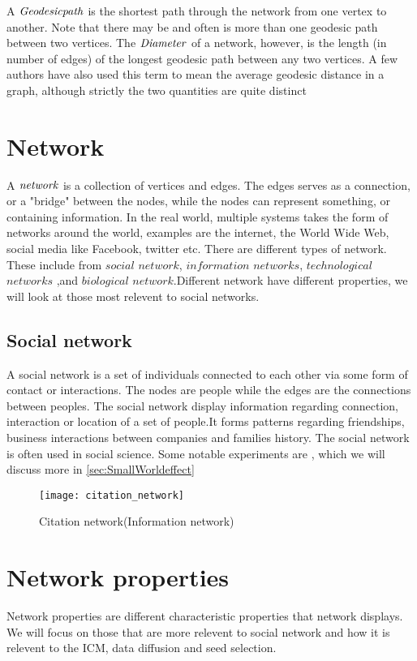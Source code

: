 A $\it{{Geodesic path}}$ is the shortest path through the network from one vertex to another. Note that there may be and often is more than one geodesic path between two vertices. The $\it{{Diameter}}$ of a network, however,  is the length (in number of edges) of the longest geodesic path between any two vertices. A few authors have also used this term to mean the average geodesic distance in a graph, although strictly the two quantities are quite distinct

\section{Network}
A $\it{network}$ is a collection of vertices and edges\cite{ComplexNetwork2003}. The edges serves as a connection, or a "bridge" between the nodes, while the nodes can represent something, or containing information. In the real world, multiple systems takes the form of networks around the world, examples are the internet, the World Wide Web, social media like Facebook, twitter etc.  There are different types of network. These include from $social$ $network$, ${information}$ ${networks}$, $technological$ $networks$ ,and $biological$ $network$.Different network have different properties, we will look at those most relevent to social networks.

\subsection{Social network}
A social network is a set of individuals connected to each other via some form of contact or interactions\cite{ComplexNetwork2003}. The nodes are people while the edges are the connections between peoples. The social network display information regarding connection, interaction or location of a set of people.It forms patterns regarding friendships, business interactions between companies and families history. The social network is often used in social science\cite{ComplexNetwork2003}. Some notable experiments are \cite{smallWorldExperiment}, which we will discuss more in \ref{sec:SmallWorldeffect} 

\begin{figure}[!ht]
\centering
	\texttt{[image: citation\_network]}
	\caption{Citation network(Information network)} 
	\label{fig:CitationN}
\end{figure}

\section{Network properties}
Network properties are different characteristic properties that network displays. We will focus on those that are more relevent to social network and how it is relevent to the ICM, data diffusion and seed selection.

